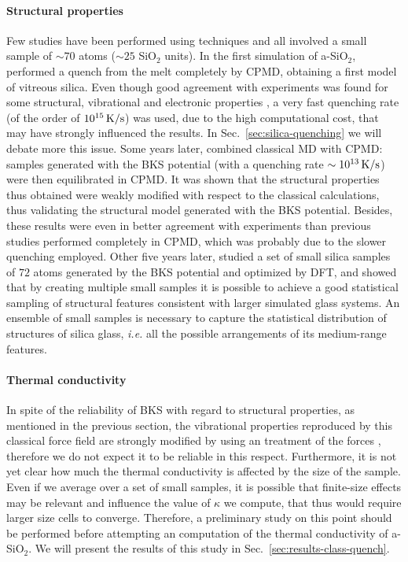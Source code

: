 \paragraph{Structural properties}
Few studies have been performed using \abinitio techniques and all involved a small sample of $\sim 70$ atoms ($\sim 25$ SiO$_2$ units). In the first \abinitio simulation of a-SiO$_2$, \citet{Sarnthein1995a} performed a quench from the melt completely by CPMD, obtaining a first model of vitreous silica. Even though good agreement with experiments was found for some structural, vibrational and electronic properties \cite{Sarnthein1995a,Sarnthein1995b,Sarnthein1997}, a very fast quenching rate (of the order of $10^{15}\,\mathrm{K/s}$) was used, due to the high computational cost, that may have strongly influenced the results. In Sec.~\ref{sec:silica-quenching} we will debate more this issue. 
Some years later, \citet{Benoit2000} combined classical MD with CPMD: samples generated with the BKS potential (with a quenching rate $\sim 10^{13}\,\mathrm{K/s}$) were then equilibrated in CPMD. It was shown that the structural properties thus obtained were weakly modified with respect to the classical calculations, thus validating the structural model generated with the BKS potential. Besides, these results were even in better agreement with experiments than previous studies performed completely in CPMD, which was probably due to the slower quenching employed. 
Other five years later, \citet{VanGinhoven2005} studied a set of small silica samples of $72$ atoms generated by the BKS potential and optimized by DFT, and showed that by creating multiple small samples it is possible to achieve a good statistical sampling of structural features consistent with larger simulated glass systems. An ensemble of small samples is necessary to capture the statistical distribution of structures of silica glass, \emph{i.e.} all the possible arrangements of its medium-range features. 

\paragraph{Thermal conductivity}
In spite of the reliability of BKS with regard to structural properties, as mentioned in the previous section, the vibrational properties reproduced by this classical force field are strongly modified by using an \abinitio treatment of the forces \cite{Benoit2002}, therefore we do not expect it to be reliable in this respect. 
Furthermore, it is not yet clear how much the thermal conductivity is affected by the size of the sample. Even if we average over a set of small samples, it is possible that finite-size effects may be relevant and influence the value of $\kappa$ we compute, that thus would require larger size cells to converge. 
Therefore, a preliminary study on this point should be performed before attempting an \abinitio computation of the thermal conductivity of a-SiO$_2$. We will present the results of this study in Sec.~\ref{sec:results-class-quench}.



